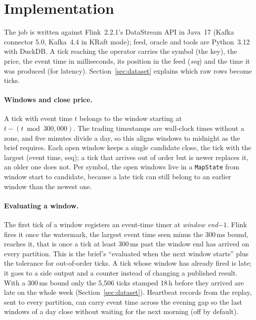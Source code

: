 \section{Implementation}
\label{sec:implementation}

The job is written against Flink~2.2.1's DataStream API in Java~17 (Kafka connector 5.0, Kafka~4.4 in KRaft
mode); feed, oracle and tools are Python~3.12 with DuckDB. A tick reaching the operator carries the symbol (the
key), the price, the event time in milliseconds, its position in the feed (\emph{seq}) and the time it was
produced (for latency). Section~\ref{sec:dataset} explains which raw rows become ticks.

\paragraph{Windows and close price.}
A tick with event time $t$ belongs to the window starting at $t - (t \bmod 300{,}000)$. The trading timestamps
are wall-clock times without a zone, and five minutes divide a day, so this aligns windows to midnight as the
brief requires. Each open window keeps a single candidate close, the tick with the largest (event time, seq);
a tick that arrives out of order but is newer replaces it, an older one does not. Per symbol, the open windows
live in a \texttt{MapState} from window start to candidate, because a late tick can still belong to an earlier
window than the newest one.

\paragraph{Evaluating a window.}
The first tick of a window registers an event-time timer at \emph{window end}$-1$. Flink fires it once the
watermark, the largest event time seen minus the 300\,ms bound, reaches it, that is once a tick at least
300\,ms past the window end has arrived on every partition. This is the brief's ``evaluated when the next
window starts'' plus the tolerance for out-of-order ticks. A tick whose window has already fired is late; it
goes to a side output and a counter instead of changing a published result. With a 300\,ms bound only the
5,506 ticks stamped 18\,h before they arrived are late on the whole week (Section~\ref{sec:dataset}).
Heartbeat records from the replay, sent to every partition, can carry event time across the evening gap so
the last windows of a day close without waiting for the next morning (off by default).

